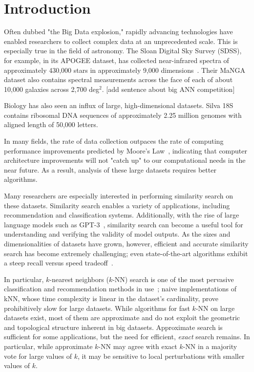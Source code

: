 \section{Introduction}
\label{sec:introduction}
Often dubbed "the Big Data explosion," rapidly advancing technologies have enabled researchers to collect complex data at an unprecedented scale. 
This is especially true in the field of astronomy. 
The Sloan Digital Sky Survey (SDSS), for example, in its APOGEE dataset, has collected near-infrared spectra of approximately 430,000 stars in approximately 9,000 dimensions~\cite{alam2015eleventh}. 
Their MaNGA dataset also contains spectral measurements across the face of each of about 10,000 galaxies across 2,700 deg$^2$. [add sentence about big ANN competition]

Biology has also seen an influx of large, high-dimensional datasets. Silva 18S contains ribosomal DNA sequences of approximately 2.25 
million genomes with aligned length of 50,000 letters. 


In many fields, the rate of data collection outpaces the rate of computing performance improvements predicted by Moore's Law~\cite{moore1965cramming}, indicating 
that computer architecture improvements will not "catch up" to our computational needs in the near future. As a result, analysis of these large datasets 
requires better algorithms. 

Many researchers are especially interested in performing similarity search on these datasets. 
Similarity search enables a variety of applications, including recommendation and classification systems. 
Additionally, with the rise of large language models such as GPT-3~\cite{brown2020language}, similarity search can become a useful tool for 
understanding and verifying the validity of model outputs. 
As the sizes and dimensionalities of datasets have grown, however, efficient and accurate similarity search has become extremely challenging; 
even state-of-the-art algorithms exhibit a steep recall versus speed tradeoff~\cite{ishaq2019clustered}.


In particular, $k$-nearest neighbors ($k$-NN) search is one of the most pervasive classification and recommendation methods in use~\cite{fix1952discriminatory, cover1967nearest}; 
naive implementations of kNN, whose time complexity is linear in the dataset's cardinality, 
prove prohibitively slow for large datasets. While algorithms for fast $k$-NN on large datasets exist, most of them are approximate and do not 
exploit the geometric and topological structure inherent in big datasets. Approximate search is sufficient for some applications, but the 
need for efficient, \emph{exact} search remains.
In particular, while approximate $k$-NN may agree with exact $k$-NN in a majority vote for large values of $k$, it may be sensitive to local perturbations with smaller values of $k$.

